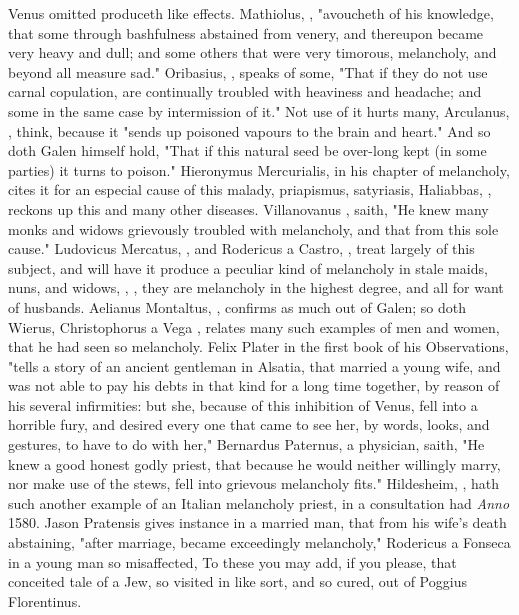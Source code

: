Venus omitted produceth like effects. Mathiolus, , "avoucheth of his knowledge, that some
through bashfulness abstained from venery, and thereupon became very heavy and
dull; and some others that were very timorous, melancholy, and beyond all
measure sad." Oribasius, ,
speaks of some, "That if they do not use carnal
copulation, are continually troubled with heaviness and headache; and some in
the same case by intermission of it." Not use of it hurts many, Arculanus,
, think,
because it "sends up poisoned vapours to the brain and
heart." And so doth Galen himself hold, "That if this natural seed be over-long
kept (in some parties) it turns to poison." Hieronymus Mercurialis, in his
chapter of melancholy, cites it for an especial cause of this malady,
priapismus, satyriasis, \etc{} Haliabbas,
, reckons up this and many other
diseases. Villanovanus , saith, "He
knew many monks and widows grievously troubled with
melancholy, and that from this sole cause." Ludovicus
Mercatus, , and
Rodericus a Castro, , treat
largely of this subject, and will have it produce a peculiar kind of melancholy
in stale maids, nuns, and widows, , \etc{}, they
are melancholy in the highest degree, and all for want of husbands. Aelianus
Montaltus, , confirms as much out
of Galen; so doth Wierus, Christophorus a Vega , relates many such examples of men and women, that he had
seen so melancholy. Felix Plater in the first book of his Observations,
"tells a story of an ancient gentleman in Alsatia, that
married a young wife, and was not able to pay his debts in that kind for a long
time together, by reason of his several infirmities: but she, because of this
inhibition of Venus, fell into a horrible fury, and desired every one that came
to see her, by words, looks, and gestures, to have to do with her," \etc{}
Bernardus Paternus, a physician, saith, "He knew a good
honest godly priest, that because he would neither willingly marry, nor make
use of the stews, fell into grievous melancholy fits." Hildesheim,
, hath such another example of an Italian
melancholy priest, in a consultation had \emph{Anno} 1580. Jason Pratensis
gives instance in a married man, that from his wife's death abstaining,
"after marriage, became exceedingly melancholy," Rodericus
a Fonseca in a young man so misaffected,  To these you may add, if you please, that conceited tale of a Jew, so
visited in like sort, and so cured, out of Poggius Florentinus.

